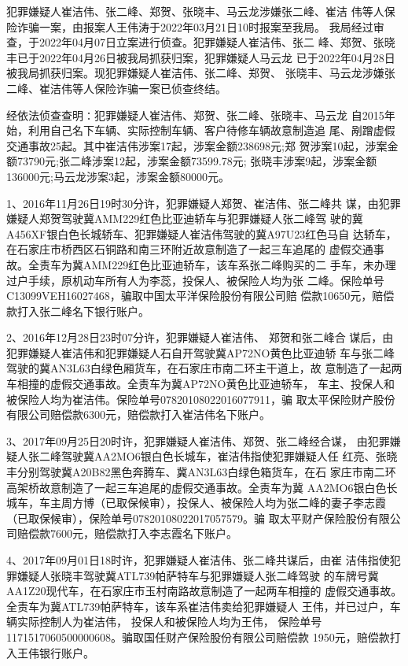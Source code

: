 犯罪嫌疑人崔洁伟、张二峰、郑贺、张晓丰、马云龙涉嫌张二峰、崔洁
伟等人保险诈骗一案，由报案人王伟涛于2022年03月21日10时报案至我局。
我局经过审查，于2022年04月07日立案进行侦查。犯罪嫌疑人崔洁伟、张二
峰、郑贺、张晓丰已于2022年04月26日被我局抓获归案，犯罪嫌疑人马云龙
已于2022年04月28日被我局抓获归案。现犯罪嫌疑人崔洁伟、张二峰、郑贺、
张晓丰、马云龙涉嫌张二峰、崔洁伟等人保险诈骗一案已侦查终结。

经依法侦查查明∶犯罪嫌疑人崔洁伟、郑贺、张二峰、张晓丰、马云龙
自2015年始，利用自己名下车辆、实际控制车辆、客户待修车辆故意制造追
尾、剐蹭虚假交通事故25起。其中崔洁伟涉案17起，涉案金额238698元;郑
贺涉案10起，涉案金额73790元;张二峰涉案12起，涉案金额73599.78元;
张晓丰涉案9起，涉案金额136000元;马云龙涉案3起，涉案金额80000元。

1、2016年11月26日19时30分许，犯罪嫌疑人郑贺、崔洁伟、张二峰共
谋，由犯罪嫌疑人郑贺驾驶冀AMM229红色比亚迪轿车与犯罪嫌疑人张二峰驾
驶的冀A456XF银白色长城轿车、犯罪嫌疑人崔洁伟驾驶的冀A97U23红色马自
达轿车，在石家庄市桥西区石铜路和南三环附近故意制造了一起三车追尾的
虚假交通事故。全责车为冀AMM229红色比亚迪轿车，该车系张二峰购买的二
手车，未办理过户手续，原机动车所有人为李蕊，投保人、被保险人均为张
二峰。保险单号C13099VEH16027468，骗取中国太平洋保险股份有限公司赔
偿款10650元，赔偿款打入张二峰名下银行账户。

2、2016年12月28日23时07分许，犯罪嫌疑人崔洁伟、 郑贺和张二峰合
谋后，由犯罪嫌疑人崔洁伟和犯罪嫌疑人石自开驾驶冀AP72NO黄色比亚迪轿
车与张二峰驾驶的冀AN3L63白绿色厢货车，在石家庄市南二环主干道上，故
意制造了一起两车相撞的虚假交通事故。全责车为冀AP72NO黄色比亚迪轿车，
车主、投保人和被保险人均为崔洁伟。保险单号07820108022016077911，骗
取太平保险财产股份有限公司赔偿款6300元，赔偿款打入崔洁伟名下账户。

3、2017年09月25日20时许，犯罪嫌疑人崔洁伟、郑贺、张二峰经合谋，
由犯罪嫌疑人张二峰驾驶冀AA2MO6银白色长城车，崔洁伟指使犯罪嫌疑人任
红亮、张晓丰分别驾驶冀A20B82黑色奔腾车、冀AN3L63白绿色箱货车，在石
家庄市南二环高架桥故意制造了一起三车追尾的虚假交通事故。全责车为冀
AA2MO6银白色长城车，车主周方博（已取保候审），投保人、被保险人均为张二峰的妻子李志霞（已取保候审），保险单号07820108022017057579。骗
取太平财产保险股份有限公司赔偿款7600元，赔偿款打入李志霞名下账户。

4、2017年09月01日18时许，犯罪嫌疑人崔洁伟、张二峰共谋后，由崔
洁伟指使犯罪嫌疑人张晓丰驾驶冀ATL739帕萨特车与犯罪嫌疑人张二峰驾驶
的车牌号冀AA1Z20现代车，在石家庄市玉村南路故意制造了一起两车相撞的
虚假交通事故。全责车为冀ATL739帕萨特车，该车系崔洁伟卖给犯罪嫌疑人
王伟，并已过户，车辆实际控制人为崔洁伟， 投保人和被保险人均为王伟，
保险单号1171517060500000608。骗取国任财产保险股份有限公司赔偿款
1950元，赔偿款打入王伟银行账户。

